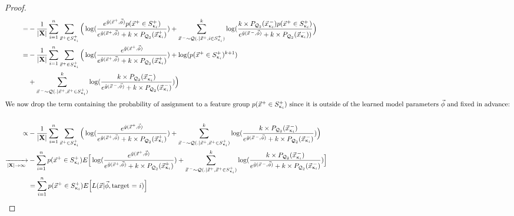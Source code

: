 \documentclass{article}
\newcommand{\vect}[1]{\vec{#1}}
\DeclareMathOperator{\q}{{\mathcal{Q}}}
\begin{document}
\begin{proof}
\begin{align*}
=& - \frac{1}{|\mathbf{X}|}\sum_{i=1}^n \sum_{\vect{x}^+ \in S^+_{\upkappa_i}} \Big( \log(\frac{e^{\tilde y(\vect{x}^+,\vec{\phi}) } p(\vect{x}^+ \in S^+_{\upkappa_i})}{e^{\tilde y(\vect{x}^+,\vec{\phi}) } + k\times P_{\q_2}(\vect{x}^+_{\upkappa_i}) } ) + \sum_{\vect{x}^{\,-} \sim \q(.|\vect{x}^+,i\in S^+_{\upkappa_i})}^k \log(\frac{ k\times P_{\q_2}(\vect{x}^{\,-}_{\upkappa_i})p(\vect{x}^+ \in S^+_{\upkappa_i})}{e^{\tilde y(\vect{x}^{\,-},\vec{\phi}) } + k\times P_{\q_2}(\vect{x}^{\,-}_{\upkappa_i})) } \Big) \\
   = & - \frac{1}{|\mathbf{X}|}\sum_{i=1}^n \sum_{\vect{x}^+ \in S^+_{\upkappa_i}} \Big( \log(\frac{e^{\tilde y(\vect{x}^+,\vec{\phi}) }}{e^{\tilde y(\vect{x}^+,\vec{\phi}) } + k\times P_{\q_2}(\vect{x}^+_{\upkappa_i}) }) + \log(p(\vect{x}^+ \in S^+_{\upkappa_i})^{k+1})\\
  &   +  \sum_{\vect{x}^{\,-} \sim \q(.|\vect{x}^+,\vect{x}^+ \in S^+_{\upkappa_i})}^k \log(\frac{ k\times P_{\q_2}(\vect{x}^{\,-}_{\upkappa_i})}{e^{\tilde y(\vect{x}^{\,-},\vec{\phi}) } +k\times P_{\q_2}(\vect{x}^{\,-}_{\upkappa_i})})   \Big) \\
\intertext{We now drop the term containing the probability of assignment to a feature group $p(\vect{x}^+ \in S^+_{\upkappa_i})$ since it is outside of the learned model parameters $\vec{\phi}$ and fixed in advance:}\\
    \propto & -\frac{1}{|\mathbf{X}|} \sum_{i=1}^n \sum_{\vect{x}^+ \in S^+_{\upkappa_i}} \Big( \log(\frac{e^{\tilde y(\vect{x}^+,\vec{\phi}) }}{e^{\tilde y(\vect{x}^+,\vec{\phi}) } +k\times P_{\q_2}(\vect{x}^+_{\upkappa_i}) }) + \sum_{\vect{x}^{\,-} \sim \q(.|\vect{x}^+,\vect{x}^+ \in S^+_{\upkappa_i})}^k \log(\frac{k\times  P_{\q_2}(\vect{x}^{\,-}_{\upkappa_i})}{e^{\tilde y(\vect{x}^{\,-},\vec{\phi}) } +k\times P_{\q_2}(\vect{x}^{\,-}_{\upkappa_i})}) \Big) \\
    \xrightarrow[|\mathbf{X}|\rightarrow \infty]{ }  & -\sum_{i=1}^n p(\vect{x}^+ \in S^+_{\upkappa_i}) E\Big[ \log(\frac{e^{\tilde y(\vect{x}^+,\vec{\phi}) }}{e^{\tilde y(\vect{x}^+,\vec{\phi}) } +k\times P_{\q_2}(\vect{x}^+_{\upkappa_i}) }) + \sum_{\vect{x}^{\,-} \sim \q(.|\vect{x}^+,\vect{x}^+ \in S^+_{\upkappa_i})}^k \log(\frac{ k\times P_{\q_2}(\vect{x}^{\,-}_{\upkappa_i})}{e^{\tilde y(\vect{x}^{\,-},\vec{\phi}) } +k\times P_{\q_2}(\vect{x}^{\,-}_{\upkappa_i})}) \Big] \\
   & = \sum_{i=1}^n p(\vect{x}^+ \in S^+_{\upkappa_i}) E\Big[ L(\vec{x} |\vec{\phi}, \text{target = $i$}) \Big]
\end{align*}


\end{proof}
\end{document}
